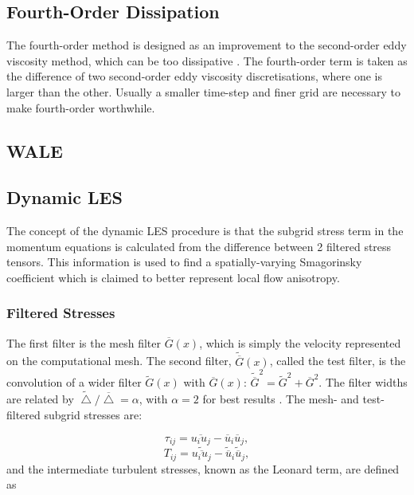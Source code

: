 \subsection{Fourth-Order Dissipation}

The fourth-order method is designed as an improvement to the second-order eddy viscosity method, which can be too dissipative \citep{adam}. The fourth-order term is taken as the difference of two second-order eddy viscosity discretisations, where one is larger than the other. Usually a smaller time-step and finer grid are necessary to make fourth-order worthwhile.

\subsection{WALE}

\subsection{Dynamic LES}\label{dynamic}

The concept of the dynamic LES procedure is that the subgrid stress term in the momentum equations is calculated from the difference between 2 filtered stress tensors. This information is used to find a spatially-varying Smagorinsky coefficient which is claimed to better represent local flow anisotropy.

\subsubsection{Filtered Stresses}

The first filter is the mesh filter $\overline G(x)$, which is simply the velocity represented on the computational mesh. The second filter, $\widetilde{\overline G}(x)$, called the test filter, is the convolution of a wider filter $\widetilde G(x)$ with $\overline G(x)$: $\widetilde{\overline G}^2 = \widetilde G^2 + \overline G^2$. The filter widths are related by $\widetilde \bigtriangleup/\overline \bigtriangleup = \alpha$, with $\alpha=2$ for best results \citep{germano1991}. The mesh- and test-filtered subgrid stresses are:

\begin{equation}\label{meshtau}
\tau_{ij} = \overline{u_i u_j} - \overline u_i \overline u_j,
\end{equation}
\begin{equation}\label{testtau}
T_{ij} = \widetilde{\overline{u_i u_j}} - \widetilde{\overline u}_i \widetilde{\overline u}_j,
\end{equation}
and the intermediate turbulent stresses, known as the Leonard term, are defined as

